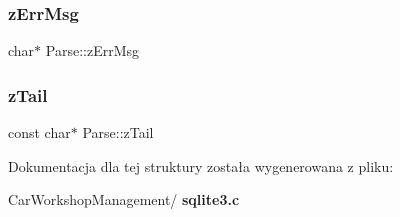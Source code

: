 \subsubsection{zErrMsg}
{\footnotesize\ttfamily char$\ast$ Parse\+::z\+Err\+Msg}

\mbox{\label{struct_parse_a14f58728b3ae2a297272510ae4bd9a89}} 
\subsubsection{zTail}
{\footnotesize\ttfamily const char$\ast$ Parse\+::z\+Tail}



Dokumentacja dla tej struktury została wygenerowana z pliku\+:\begin{DoxyCompactItemize}
\item 
Car\+Workshop\+Management/\textbf{ sqlite3.\+c}\end{DoxyCompactItemize}
